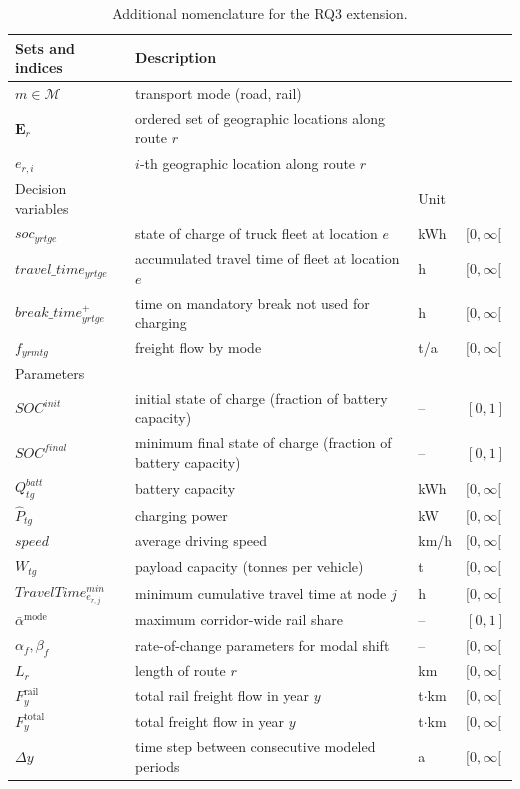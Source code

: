         \begin{scriptsize}
        \begin{longtable}{llll}
        \caption{Additional nomenclature for the RQ3 extension.}
        \label{tab:nomenclature_rq3}\\
        \hline
        Sets and indices & Description & & \\ \hline
        \endfirsthead
        \endhead
        \hline
        \endfoot
        \endlastfoot
        $m \in \mathcal{M}$ & transport mode (road, rail) & & \\
        $\mathbf{E}_r$ & ordered set of geographic locations along route $r$ & & \\
        $e_{r,i}$ & $i$-th geographic location along route $r$ & & \\ \hline
        Decision variables & & Unit & \\ \hline
        $soc_{yrtge}$ & state of charge of truck fleet at location $e$ & kWh & $[0, \infty[$ \\
        $travel\_time_{yrtge}$ & accumulated travel time of fleet at location $e$ & h & $[0, \infty[$ \\
        $break\_time^+_{yrtge}$ & time on mandatory break not used for charging & h & $[0, \infty[$ \\
        $f_{yrmtg}$ & freight flow by mode & t/a & $[0, \infty[$ \\ \hline
        Parameters & & & \\ \hline
        $SOC^{init}$ & initial state of charge (fraction of battery capacity) & -- & $[0, 1]$ \\
        $SOC^{final}$ & minimum final state of charge (fraction of battery capacity) & -- & $[0, 1]$ \\
        $Q^{batt}_{tg}$ & battery capacity & kWh & $[0, \infty[$ \\
        $\hat{P}_{tg}$ & charging power & kW & $[0, \infty[$ \\
        $speed$ & average driving speed & km/h & $[0, \infty[$ \\
        $W_{tg}$ & payload capacity (tonnes per vehicle) & t & $[0, \infty[$ \\
        $TravelTime^{min}_{e_{r,j}}$ & minimum cumulative travel time at node $j$ & h & $[0, \infty[$ \\
        $\bar{\alpha}^{\mathrm{mode}}$ & maximum corridor-wide rail share & -- & $[0, 1]$ \\
        $\alpha_f, \beta_f$ & rate-of-change parameters for modal shift & -- & $[0, \infty[$ \\
        $L_r$ & length of route $r$ & km & $[0, \infty[$ \\
        $F^{\mathrm{rail}}_y$ & total rail freight flow in year $y$ & t$\cdot$km & $[0, \infty[$ \\
        $F^{\mathrm{total}}_y$ & total freight flow in year $y$ & t$\cdot$km & $[0, \infty[$ \\
        $\Delta y$ & time step between consecutive modeled periods & a & $[0, \infty[$ \\
        \hline
        \end{longtable}
        \end{scriptsize}

